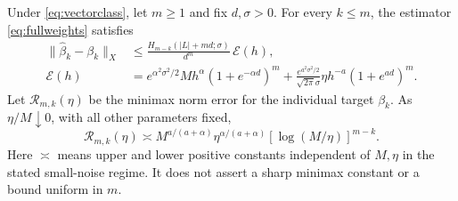 \begin{theorem}\label{thm:fulljet}
Under \eqref{eq:vectorclass}, let $m\ge1$ and fix $d,\sigma>0$.
For every $k\le m$, the estimator \eqref{eq:fullweights} satisfies
\begin{align}
 \|\widehat\beta_k-\beta_k\|_X
 &\le \frac{H_{m-k}(|L|+md;\sigma)}{d^m}\,
 \mathcal E(h),\label{eq:fullbound}\\
 \mathcal E(h)&=
 e^{\alpha^2\sigma^2/2}Mh^\alpha(1+e^{-\alpha d})^m
 +\frac{e^{a^2\sigma^2/2}}{\sqrt{2\pi}\sigma}
 \eta h^{-a}(1+e^{ad})^m.\nonumber
\end{align}
Let $\mathcal R_{m,k}(\eta)$ be the minimax norm error for the
individual target $\beta_k$. As $\eta/M\downarrow0$, with all other
parameters fixed,
\begin{equation}\label{eq:fullrate}
 \mathcal R_{m,k}(\eta)\asymp
 M^{a/(a+\alpha)}\eta^{\alpha/(a+\alpha)}
 [\log(M/\eta)]^{m-k}.
\end{equation}
Here $\asymp$ means upper and lower positive constants independent of
$M,\eta$ in the stated small-noise regime. It does not assert a sharp
minimax constant or a bound uniform in $m$.
\end{theorem}
